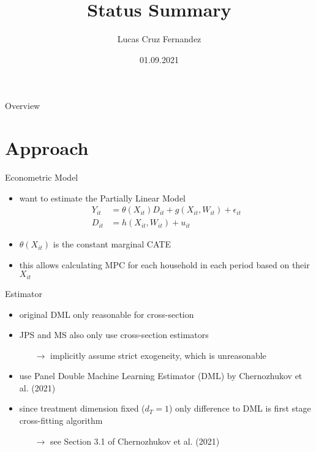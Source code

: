 \documentclass[a4paper, 12pt]{beamer}
\title{Status Summary}
\date{01.09.2021}
\author{Lucas Cruz Fernandez}
\begin{document}
\begin{frame}
    \maketitle
\end{frame}

\begin{frame}{Overview}
  \tableofcontents
\end{frame}

\section{Approach}
\begin{frame}{Econometric Model}
  \begin{itemize}
    \item want to estimate the Partially Linear Model
    \begin{align} 
    Y_{it}&=\theta(X_{it})D_{it}+g(X_{it}, W_{it})+\epsilon_{it} \\
    D_{it}&=h(X_{it}, W_{it})+u_{it}
    \end{align}
    \item $\theta(X_{it})$ is the constant marginal CATE
    \item this allows calculating MPC for each household in each period based on their $X_{it}$
  \end{itemize}
\end{frame}

\begin{frame}{Estimator}
  \begin{itemize}
    \item original DML only reasonable for cross-section
    \item JPS and MS also only use cross-section estimators
    \begin{itemize}
      \item[$\rightarrow$] implicitly assume strict exogeneity, which is unreasonable
    \end{itemize}
    \item use Panel Double Machine Learning Estimator (DML) by Chernozhukov et al. (2021)
    \item since treatment dimension fixed ($d_T=1$) only difference to DML is first stage cross-fitting algorithm 
    \begin{itemize}
      \item[$\rightarrow$] see Section 3.1 of Chernozhukov et al. (2021)
    \end{itemize}
  \end{itemize}
\end{frame}
\end{document}
